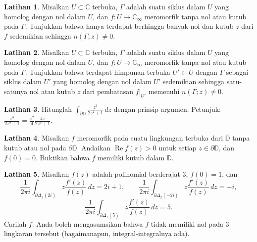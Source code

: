 \documentclass[12pt,openany]{book}
\renewcommand{\Re}{\operatorname{Re}}
\newcommand{\C}{{\mathbb{C}}}
\newcommand{\D}{{\mathbb{D}}}
\theoremstyle{plain}
\theoremstyle{remark}
\theoremstyle{definition}
\newenvironment{exbox}{%
    \def\FrameCommand{\vrule width 1pt \relax\hspace{10pt}}%
    \MakeFramed{\advance\hsize-\width\FrameRestore}%
}{%
    \endMakeFramed
}
\theoremstyle{exercise}
\newtheorem{exercise}{Latihan}[section]
\theoremstyle{example}
\begin{document}
\begin{exbox}
\begin{exercise}
Misalkan $U \subset \C$ terbuka, $\Gamma$ adalah suatu siklus dalam $U$
yang homolog dengan nol dalam $U$,
dan $f \colon U \to \C_\infty$ meromorfik tanpa nol atau kutub pada $\Gamma$.
Tunjukkan bahwa hanya terdapat berhingga banyak nol dan kutub $z$ dari $f$
sedemikian sehingga $n(\Gamma;z) \neq 0$.
\end{exercise}

\begin{exercise}
Misalkan $U \subset \C$ terbuka, $\Gamma$ adalah suatu siklus dalam $U$
yang homolog dengan nol dalam $U$,
dan $f \colon U \to \C_\infty$ meromorfik tanpa
nol atau kutub pada $\Gamma$.
Tunjukkan bahwa terdapat himpunan terbuka $U' \subset U$
dengan $\Gamma$ sebagai siklus dalam $U'$ yang homolog dengan nol dalam $U'$ sedemikian sehingga
satu-satunya nol atau kutub $z$ dari pembatasan $f|_{U'}$
memenuhi $n(\Gamma;z) \neq 0$.
\end{exercise}

\begin{exercise}
Hitunglah $\int_{\partial \D} \frac{z^3}{2 z^2+1} \, dz$ dengan prinsip
argumen. Petunjuk: $\frac{z^3}{2 z^2+1}=\frac{z^2}{4} \frac{4z}{2z^2+1}$.
\end{exercise}

\begin{exercise}
Misalkan $f$ meromorfik pada suatu lingkungan terbuka dari $\overline{\D}$
tanpa kutub atau nol pada $\partial \D$. Andaikan $\Re f(z) >
0$ untuk setiap $z \in \partial \D$, dan $f(0) = 0$. Buktikan bahwa $f$ memiliki kutub
dalam $\D$.
\end{exercise}

\begin{exercise}
Misalkan $f(z)$ adalah polinomial berderajat $3$, $f(0)=1$, dan
\begin{equation*}
\frac{1}{2\pi i}
\int_{\partial \Delta_2(2i)} z \frac{f'(z)}{f(z)} \, dz = 2i+1 ,
\qquad
\frac{1}{2\pi i}
\int_{\partial \Delta_2(-2i)} z \frac{f'(z)}{f(z)} \, dz = -i ,
\end{equation*}
\begin{equation*}
\frac{1}{2\pi i}
\int_{\partial \Delta_1(5)} z \frac{f'(z)}{f(z)} \, dz = 5 .
\end{equation*}
Carilah $f$. Anda boleh mengasumsikan bahwa $f$ tidak memiliki nol pada $3$ lingkaran tersebut
(bagaimanapun, integral-integralnya ada).
\end{exercise}


\end{exbox}
\end{document}
